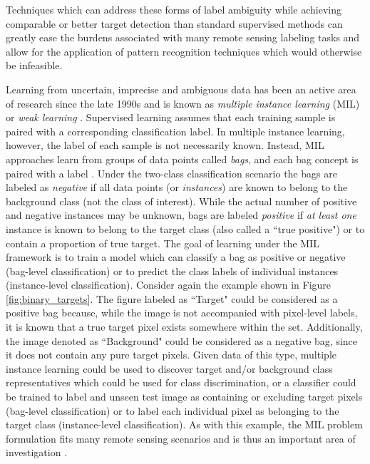 Techniques which can address these forms of label ambiguity while achieving comparable or better target detection than standard supervised methods can greatly ease the burdens associated with many remote sensing labeling tasks and allow for the application of pattern recognition techniques which would otherwise be infeasible.

Learning from uncertain, imprecise and ambiguous data has been an active area of research since the late 1990s and is known as \textit{multiple instance learning} (MIL) or \textit{weak learning} \citep{Bocinsky2019Thesis}.  Supervised learning assumes that each training sample is paired with a corresponding classification label.  In multiple instance learning, however, the label of each sample is not necessarily known.  Instead, MIL approaches learn from groups of data points called \textit{bags}, and each bag concept is paired with a label \citep{Cook2015Thesis}. Under the two-class classification scenario the bags are labeled as \textit{negative} if all data points (or \textit{instances}) are known to belong to the background class (not the class of interest).  While the actual number of positive and negative instances may be unknown, bags are labeled \textit{positive} if \textit{at least one} instance is known to belong to the target class (also called a ``true positive") \citep{Zare2016MIACE} or to contain a proportion of true target.  The goal of learning under the MIL framework is to train a model which can classify a bag as positive or negative (bag-level classification) or to predict the class labels of individual instances (instance-level classification). Consider again the example shown in Figure \ref{fig:binary_targets}.  The figure labeled as ``Target" could be considered as a positive bag because, while the image is not accompanied with pixel-level labels, it is known that a true target pixel exists somewhere within the set.  Additionally, the image denoted as ``Background" could be considered as a negative bag, since it does not contain any pure target pixels.  Given data of this type, multiple instance learning could be used to discover target and/or background class representatives which could be used for class discrimination, or a classifier could be trained to label and unseen test image as containing or excluding target pixels (bag-level classification) or to label each individual pixel as belonging to the target class (instance-level classification).  As with this example, the MIL problem formulation fits many remote sensing scenarios and is thus an important area of investigation \citep{Du2017Thesis}.  


